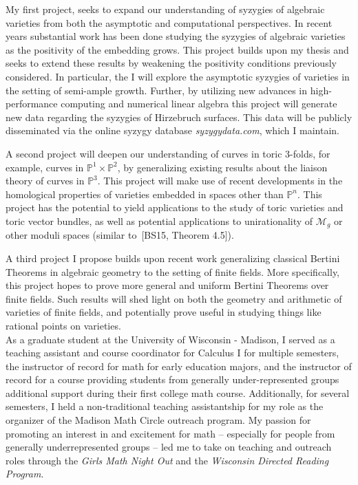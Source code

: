 \documentclass[11pt]{article}
\begin{document}
My first project, seeks to expand our understanding of syzygies of algebraic varieties from both the asymptotic and computational perspectives. In recent years substantial work has been done studying the syzygies of algebraic varieties as the positivity of the embedding grows. This project builds upon my thesis and seeks to extend these results by weakening the positivity conditions previously considered. In particular, the I will explore the asymptotic syzygies of varieties in the setting of semi-ample growth. Further, by utilizing new advances in high-performance computing and numerical linear algebra this project will generate new data regarding the syzygies of Hirzebruch surfaces. This data will be publicly disseminated via the online syzygy database \textit{syzygydata.com}, which I maintain.  

A second project will deepen our understanding of curves in toric 3-folds, for example, curves in $\mathbb{P}^1\times\mathbb{P}^2$, by generalizing existing results about the liaison theory of curves in $\mathbb{P}^3$. This project will make use of recent developments in the homological properties of varieties embedded in spaces other than $\mathbb{P}^n$. This project has the potential to yield applications to the study of toric varieties and toric vector bundles, as well as potential applications to unirationality of $\mathcal{M}_g$ or other moduli spaces (similar to~[BS15, Theorem 4.5]).

A third project I propose builds upon recent work generalizing classical Bertini Theorems in algebraic geometry to the setting of finite fields. More specifically, this project hopes to prove more general and uniform Bertini Theorems over finite fields. Such results will shed light on both the geometry and arithmetic of varieties of finite fields, and potentially prove useful in studying things like rational points on varieties. 
\\


As a graduate student at the University of Wisconsin - Madison, I served as a teaching assistant and course coordinator for Calculus I for multiple semesters, the instructor of record for math for early education majors, and the instructor of record for a course providing students from generally under-represented groups additional support during their first college math course. Additionally, for several semesters, I held a non-traditional teaching assistantship for my role as the organizer of the Madison Math Circle outreach program. My passion for promoting an interest in and excitement for math -- especially for people from generally underrepresented groups -- led me to take on teaching and outreach roles through the \textit{Girls Math Night Out} and the \textit{Wisconsin Directed Reading Program}. 
\end{document}
